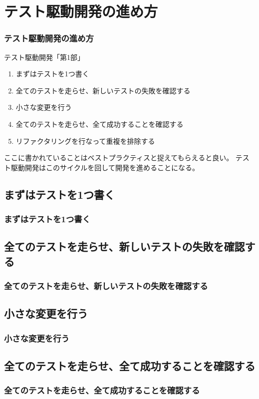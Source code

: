 \documentclass[aspectratio=169]{beamer}
\begin{document}
\section{テスト駆動開発の進め方}
\begin{frame}\frametitle{テスト駆動開発の進め方}
  {\small \color[gray]{0.5} テスト駆動開発「第1部」}
  \begin{enumerate}
    \item まずはテストを1つ書く
    \item 全てのテストを走らせ、新しいテストの失敗を確認する
    \item 小さな変更を行う
    \item 全てのテストを走らせ、全て成功することを確認する
    \item リファクタリングを行なって重複を排除する
  \end{enumerate}

  \vspace{1\baselineskip}
  ここに書かれていることはベストプラクティスと捉えてもらえると良い。
  テスト駆動開発はこのサイクルを回して開発を進めることになる。
\end{frame}

\subsection{まずはテストを1つ書く}
\begin{frame}\frametitle{まずはテストを1つ書く}
\end{frame}

\subsection{全てのテストを走らせ、新しいテストの失敗を確認する}
\begin{frame}\frametitle{全てのテストを走らせ、新しいテストの失敗を確認する}
\end{frame}

\subsection{小さな変更を行う}
\begin{frame}\frametitle{小さな変更を行う}
\end{frame}

\subsection{全てのテストを走らせ、全て成功することを確認する}
\begin{frame}\frametitle{全てのテストを走らせ、全て成功することを確認する}
\end{frame}
\end{document}
